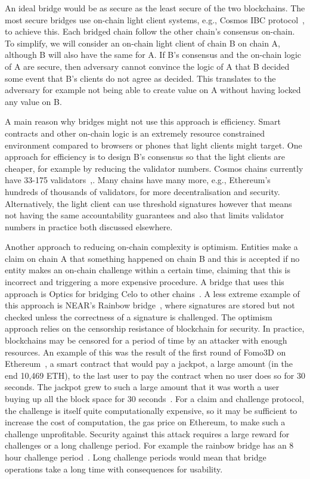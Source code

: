 \noindent An ideal bridge would be as secure as the least secure of the two blockchains. The most secure bridges use on-chain light client systems, e.g., Cosmos IBC protocol~\cite{IBC_paper}, to achieve this. Each bridged chain follow the other chain's consensus on-chain. To simplify, we will consider an on-chain light client of chain B on chain A, although B will also have the same for A. If B's consensus and the on-chain logic of A are secure, then adversary cannot convince the logic of A that B decided some event that B's clients do not agree as decided. This translates to the adversary for example not being able to create value on A without having locked any value on B.

\noindent A main reason why bridges might not use this approach is efficiency. Smart contracts and other on-chain logic is an extremely resource constrained environment compared to browsers or phones that light clients might target. One approach for efficiency is to design B's consensus so that the light clients are cheaper, for example by reducing the validator numbers. Cosmos chains currently have 33-175 validators~\cite{CosmosValNYX},\cite{CosmosValHUB}. Many chains have many more, e.g., Ethereum's hundreds of thousands of validators, for more decentralisation and security. Alternatively, the light client can use threshold signatures however that means not having the same accountability guarantees and also that limits validator numbers in practice both discussed elsewhere.


\noindent Another approach to reducing on-chain complexity is optimism. Entities make a claim on chain A that something happened on chain B and this is accepted if no entity makes an on-chain challenge within a certain time, claiming that this is incorrect and triggering a more expensive procedure. A bridge that uses this approach is Optics for bridging Celo to other chains~\cite{CeloOptics}. A less extreme example of this approach is NEAR's Rainbow bridge~\cite{NEARrainbowB}, where signatures are stored but not checked unless the correctness of a signature is challenged. The optimism approach relies on the censorship resistance of blockchain for security. In practice, blockchains may be censored for a period of time by an attacker with enough resources. An example of this was the result of the first round of Fomo3D on Ethereum~\cite{Fomo3DPM}, a smart contract that would pay a jackpot, a large amount (in the end 10,469 ETH), to the last user to pay the contract when no user does so for 30 seconds. The jackpot grew to such a large amount that it was worth a user buying up all the block space for 30 seconds~\cite{Fomo3DPM}. For a claim and challenge protocol, the challenge is itself quite computationally expensive, so it may be sufficient to increase the cost of computation, the gas price on Ethereum, to make such a challenge unprofitable. Security against this attack requires a large reward for challenges or a long challenge period. For example the rainbow bridge has an 8 hour challenge period~\cite{RainbowBridgeFAQ}. Long challenge periods would mean that bridge operations take a long time with consequences for usability.

